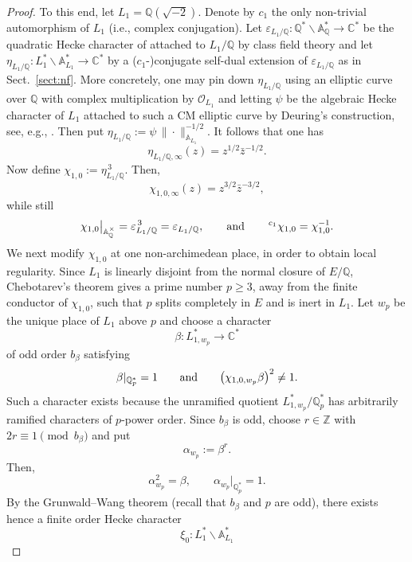 \documentclass[a4paper,10pt]{amsart}
\theoremstyle{definition}
\numberwithin{equation}{section}
\def\A{\mathbb A}
\def\C{\mathbb C}
\begin{document}
\begin{proof}
To this end, let $L_1=\mathbb Q(\sqrt{-2})$. Denote by $c_1$ the only non-trivial automorphism of $L_1$ (i.e., complex conjugation). Let $\varepsilon_{L_1/\mathbb Q}: \mathbb Q^*\backslash\mathbb A_\mathbb Q^*\rightarrow\C^*$ be the quadratic Hecke character of attached to
\(L_1/\mathbb Q\) by class field theory and let $\eta_{L_1/\mathbb Q}: L_1^*\backslash \A_{L_1}^*\rightarrow\C^*$ by a ($c_1$-)conjugate self-dual extension of $\varepsilon_{L_1/\mathbb Q}$ as in Sect.\ \ref{sect:nf}. More concretely, one may pin down $\eta_{L_1/\mathbb Q}$ using an elliptic curve over
\(\mathbb Q\) with complex multiplication by \(\mathcal O_{L_1}\) and letting \(\psi\) be the algebraic Hecke character of \(L_1\) attached to such a CM elliptic curve by Deuring's construction, see, e.g., \cite[Chp.\ II, \S\S 9--10]{Sil94}. Then put $\eta_{L_1/\mathbb Q}
        :=
        \psi\,\|\cdot\|_{\mathbb A_{L_1}}^{-1/2}$. It follows that one has
$$
        \eta_{L_1/\mathbb Q,\infty}(z)
        =
        z^{1/2}\bar z^{-1/2}.
$$
Now define $\chi_{1,0}
        :=
        \eta_{L_1/\mathbb Q}^{\,3}.$ Then,
$$
        \chi_{1,0,\infty}(z)
        =
        z^{3/2}\bar z^{-3/2},
$$
while still
$$
        \chi_{1,0}
        \big|_{\mathbb A_\mathbb Q^\times}
        =
        \varepsilon_{L_1/\mathbb Q}^{\,3}
        =
        \varepsilon_{L_1/\mathbb Q},  \quad\quad {\rm and} \quad\quad   {}^{\,c_1} \chi_{1,0}=\chi_{1,0}^{-1}.
$$
We next modify \(\chi_{1,0}\) at one non-archimedean place, in order to obtain local regularity. Since \(L_1\) is linearly disjoint from the normal closure of \(E/\mathbb Q\), Chebotarev's theorem gives a prime number \(p\geq 3\), away from the finite conductor of \(\chi_{1,0}\), such that \(p\) splits completely in \(E\) and is inert in \(L_1\). Let $w_p$ be the unique place of \(L_1\) above \(p\) and choose a character
$$
        \beta:L_{1,w_p}^{*}\longrightarrow\mathbb C^{*}
$$
of odd order $b_\beta$ satisfying
$$
        \beta|_{\mathbb Q_p^*}=1 \quad\quad {\rm and}\quad\quad      \bigl(\chi_{1,0,w_p}\beta\bigr)^2\neq 1.
$$
Such a character exists because the unramified quotient $ L_{1,w_p}^{*}/\mathbb Q_p^*$ has arbitrarily ramified characters of \(p\)-power order. Since \(b_\beta\) is odd, choose
\(r\in\mathbb Z\) with $2r\equiv 1\pmod{b_\beta}$ and put
$$
        \alpha_{w_p}:=\beta^r.
$$
Then,
$$
        \alpha_{w_p}^2=\beta,
        \qquad
        \alpha_{w_p}|_{\mathbb Q_p^*}=1.
$$
By the Grunwald--Wang theorem (recall that $b_\beta$ and $p$ are odd), there exists hence a finite order Hecke character
$$
        \xi_0:L_1^*\backslash \mathbb A_{L_1}^{*}
$$
\end{proof}
\end{document}
